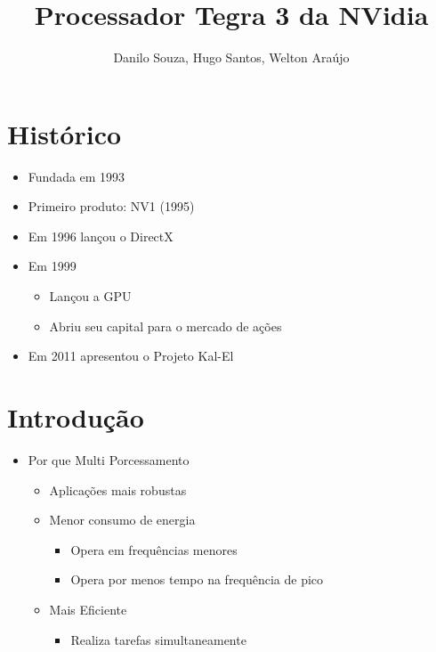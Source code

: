 \documentclass{beamer}
\title[Tegra 3]{ Processador Tegra 3 da NVidia}
\author{Danilo Souza, Hugo Santos, Welton Ara\'ujo}
\institute{
Universidade Federal do Par\'a
}
\begin{document}
\begin{frame}
  \tableofcontents
\end{frame}

\section{Hist\'orico}
 \begin{frame}
  \begin{itemize}
    \item  Fundada em 1993
    \item  Primeiro produto: NV1 (1995)
    \item  Em 1996 lan\c{c}ou o DirectX
    \item  Em 1999
    \begin{itemize}
     \item Lan\c{c}ou a GPU
     \item Abriu seu capital para o mercado de a\c{c}\~oes
    \end{itemize}
    \item Em 2011 apresentou o Projeto Kal-El
  \end{itemize}
\end{frame}


\section{Introdu\c{c}\~ao}
\begin{frame}
  \begin{itemize}
    \item Por que Multi Porcessamento
    \begin{itemize}
      \item Aplica\c{c}\~oes mais robustas
      \item Menor consumo de energia
      \begin{itemize}
	\item Opera em frequ\^encias menores
	\item Opera por menos tempo na frequ\^encia de pico
      \end{itemize}
    \item Mais Eficiente
    \begin{itemize}
      \item Realiza tarefas simultaneamente
    \end{itemize}
   \end{itemize}
  \end{itemize}
\end{frame}
\end{document}
